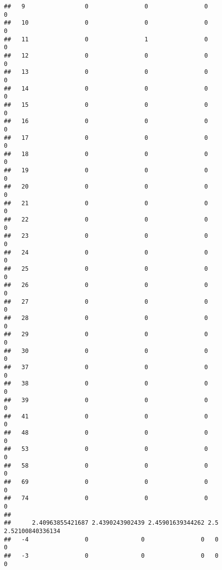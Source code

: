 \documentclass[]{article}
\begin{document}
\begin{verbatim}
##   9                 0                0                0                0
##   10                0                0                0                0
##   11                0                1                0                0
##   12                0                0                0                0
##   13                0                0                0                0
##   14                0                0                0                0
##   15                0                0                0                0
##   16                0                0                0                0
##   17                0                0                0                0
##   18                0                0                0                0
##   19                0                0                0                0
##   20                0                0                0                0
##   21                0                0                0                0
##   22                0                0                0                0
##   23                0                0                0                0
##   24                0                0                0                0
##   25                0                0                0                0
##   26                0                0                0                0
##   27                0                0                0                0
##   28                0                0                0                0
##   29                0                0                0                0
##   30                0                0                0                0
##   37                0                0                0                0
##   38                0                0                0                0
##   39                0                0                0                0
##   41                0                0                0                0
##   48                0                0                0                0
##   53                0                0                0                0
##   58                0                0                0                0
##   69                0                0                0                0
##   74                0                0                0                0
##     
##      2.40963855421687 2.4390243902439 2.45901639344262 2.5 2.52100840336134
##   -4                0               0                0   0                0
##   -3                0               0                0   0                0

\end{verbatim}
\end{document}
